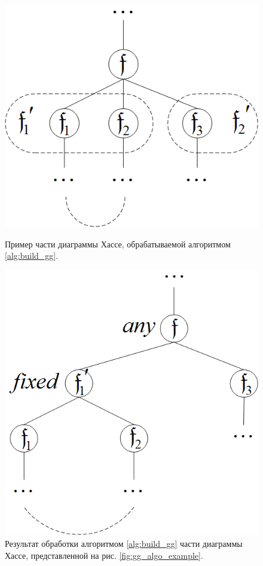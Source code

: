 \begin{figure}[htb!]
\centering
\begin{minipage}[t]{0.4\textwidth}
\centering
\includegraphics[scale=1.0]{images/gg_algo_class.png}
\caption{Пример части диаграммы Хассе, обрабатываемой алгоритмом \ref{alg:build_gg}.}
\label{fig:gg_algo_example}
\end{minipage}
\hspace{0.5cm}
\begin{minipage}[t]{0.4\textwidth}
\centering
\includegraphics[scale=1.0]{images/gg_algo_class_2.png}
\caption{Результат обработки алгоритмом \ref{alg:build_gg} части диаграммы Хассе, представленной на рис. \ref{fig:gg_algo_example}.}
\label{fig:gg_algo_result}
\end{minipage}
\end{figure}

